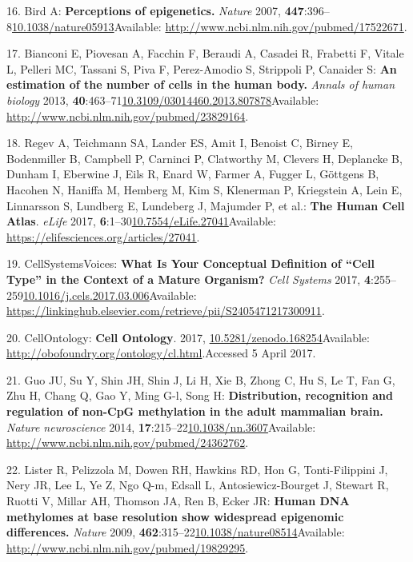 \documentclass[
]{book}
\begin{document}
\leavevmode\hypertarget{ref-Bird2007}{}%
16. Bird A: \textbf{Perceptions of epigenetics.} \emph{Nature} 2007, \textbf{447}:396--8\href{https://doi.org/10.1038/nature05913}{10.1038/nature05913}Available: \url{http://www.ncbi.nlm.nih.gov/pubmed/17522671}.

\leavevmode\hypertarget{ref-Bianconi2013}{}%
17. Bianconi E, Piovesan A, Facchin F, Beraudi A, Casadei R, Frabetti F, Vitale L, Pelleri MC, Tassani S, Piva F, Perez-Amodio S, Strippoli P, Canaider S: \textbf{An estimation of the number of cells in the human body.} \emph{Annals of human biology} 2013, \textbf{40}:463--71\href{https://doi.org/10.3109/03014460.2013.807878}{10.3109/03014460.2013.807878}Available: \url{http://www.ncbi.nlm.nih.gov/pubmed/23829164}.

\leavevmode\hypertarget{ref-Regev2017}{}%
18. Regev A, Teichmann SA, Lander ES, Amit I, Benoist C, Birney E, Bodenmiller B, Campbell P, Carninci P, Clatworthy M, Clevers H, Deplancke B, Dunham I, Eberwine J, Eils R, Enard W, Farmer A, Fugger L, Göttgens B, Hacohen N, Haniffa M, Hemberg M, Kim S, Klenerman P, Kriegstein A, Lein E, Linnarsson S, Lundberg E, Lundeberg J, Majumder P, et al.: \textbf{The Human Cell Atlas}. \emph{eLife} 2017, \textbf{6}:1--30\href{https://doi.org/10.7554/eLife.27041}{10.7554/eLife.27041}Available: \url{https://elifesciences.org/articles/27041}.

\leavevmode\hypertarget{ref-CellSystemsCellType2017}{}%
19. CellSystemsVoices: \textbf{What Is Your Conceptual Definition of ``Cell Type'' in the Context of a Mature Organism?} \emph{Cell Systems} 2017, \textbf{4}:255--259\href{https://doi.org/10.1016/j.cels.2017.03.006}{10.1016/j.cels.2017.03.006}Available: \url{https://linkinghub.elsevier.com/retrieve/pii/S2405471217300911}.

\leavevmode\hypertarget{ref-CellOntologyOBO}{}%
20. CellOntology: \textbf{Cell Ontology}. 2017, \href{https://doi.org/10.5281/zenodo.168254}{10.5281/zenodo.168254}Available: \url{http://obofoundry.org/ontology/cl.html}.Accessed 5 April 2017.

\leavevmode\hypertarget{ref-Guo2014a}{}%
21. Guo JU, Su Y, Shin JH, Shin J, Li H, Xie B, Zhong C, Hu S, Le T, Fan G, Zhu H, Chang Q, Gao Y, Ming G-l, Song H: \textbf{Distribution, recognition and regulation of non-CpG methylation in the adult mammalian brain.} \emph{Nature neuroscience} 2014, \textbf{17}:215--22\href{https://doi.org/10.1038/nn.3607}{10.1038/nn.3607}Available: \url{http://www.ncbi.nlm.nih.gov/pubmed/24362762}.

\leavevmode\hypertarget{ref-Lister2009}{}%
22. Lister R, Pelizzola M, Dowen RH, Hawkins RD, Hon G, Tonti-Filippini J, Nery JR, Lee L, Ye Z, Ngo Q-m, Edsall L, Antosiewicz-Bourget J, Stewart R, Ruotti V, Millar AH, Thomson JA, Ren B, Ecker JR: \textbf{Human DNA methylomes at base resolution show widespread epigenomic differences.} \emph{Nature} 2009, \textbf{462}:315--22\href{https://doi.org/10.1038/nature08514}{10.1038/nature08514}Available: \url{http://www.ncbi.nlm.nih.gov/pubmed/19829295}.
\end{document}
